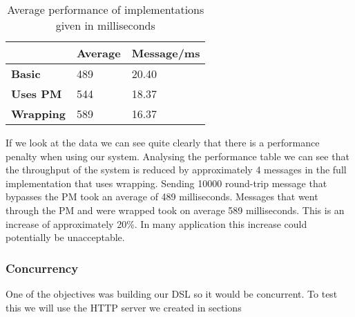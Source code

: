 \begin{table}[h]
	\centering
	\begin{tabular}{|l|l|l|}
		\hline
		{\bf }         & {\bf Average} & {\bf Message/ms} \\ \hline
		{\bf Basic}    & 489           & 20.40              \\ \hline
		{\bf Uses PM}  & 544           & 18.37              \\ \hline
		{\bf Wrapping} & 589           & 16.37              \\ \hline
	\end{tabular}
	\label{tab:performance}
	\caption{Average performance of implementations given in milliseconds}
\end{table}
If we look at the data we can see quite clearly that there is a performance penalty when using our system. Analysing the performance table we can see that the throughput of the system is reduced by approximately 4 messages in the full implementation that uses wrapping. Sending 10000 round-trip message that bypasses the PM took an average of 489 milliseconds. Messages that went through the PM and were wrapped took on average 589 milliseconds. This is an increase of approximately 20\%. In many application this increase could potentially be unacceptable.

\subsubsection{Concurrency}
One of the objectives was building our DSL so it would be concurrent. To test this we will use the HTTP server we created in sections


